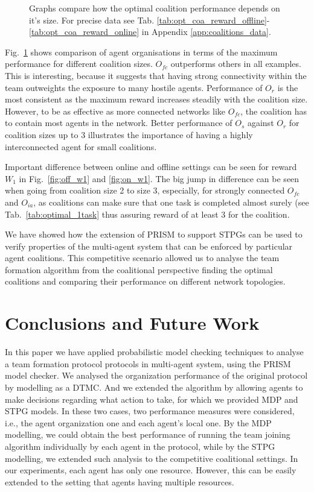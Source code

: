 \documentclass{llncs}
\begin{document}
\begin{figure}[H]
{{}}
\caption{Graphs compare how the optimal coalition performance depends on it's size. For precise data see Tab. \ref{tab:opt_coa_reward_offline}-\ref{tab:opt_coa_reward_online} in Appendix \ref{app:coalitions_data}.}
\label{fig:coalition_performance}
\end{figure}

Fig.~\ref{fig:coalition_performance} shows comparison of agent organisations in terms of the maximum performance for different coalition sizes. $O_{fc}$ outperforms others in all examples.
This is interesting, because it suggests that having strong connectivity within the team outweights the exposure to many hostile agents. Performance of $O_r$ is the most consistent as the maximum reward increases steadily with the coalition size.
However, to be as effective as more connected networks like $O_{fc}$, the coalition has to contain most agents in the network. Better performance of $O_s$ against $O_r$ for coalition sizes up to 3 illustrates the importance of having a highly interconnected agent for small coalitions.

Important difference between online and offline settings can be seen for reward $W_1$ in Fig.~\ref{fig:off_w1} and \ref{fig:on_w1}. The big jump in difference can be seen when going from coalition size 2 to size 3, especially, for strongly connected $O_{fc}$ and $O_{ia}$, as coalitions can make sure that one task is completed almost surely (see Tab.~\ref{tab:optimal_1task} thus assuring reward of at least 3 for the coalition.


We have showed how the extension of PRISM to support STPGs can be used to verify properties of the multi-agent system that can be enforced by particular agent coalitions. This competitive  scenario allowed us to analyse the team formation algorithm from the coalitional perspective finding the optimal coalitions and comparing their performance on different network topologies.


\section{Conclusions and Future Work}

In this paper we have applied probabilistic model checking techniques to analyse a team formation protocol protocols in multi-agent system, using the PRISM model checker. We analysed the organization performance of the original protocol by modelling as a DTMC. And we extended the algorithm by allowing agents to make decisions regarding what action to take, for which we provided MDP and STPG models. In these two cases, two performance measures were considered, i.e., the agent organization one and each agent's local one. By the MDP modelling, we could obtain the best performance
of running the team joining algorithm individually by each agent in the protocol, while by the STPG modelling, we extended such analysis to the competitive coalitional settings. In our experiments, each agent has only one resource. However, this can be easily extended to the setting that agents having multiple resources.
\end{document}
